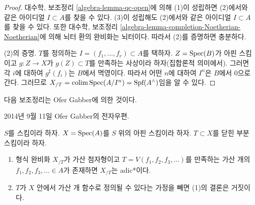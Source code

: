 \begin{proof}
대수학, 보조정리 \ref{algebra-lemma-qc-open}에 의해 (1)이
성립하면 (2)에서와 같은 아이디얼 $I \subset A$를 찾을 수 있다.
(3)이 성립해도 (2)에서와 같은 아이디얼 $I \subset A$를 찾을 수
있다. 또한 대수학, 보조정리
\ref{algebra-lemma-completion-Noetherian-Noetherian}에 의해
뇌터 환의 완비화는 뇌터이다. 따라서 (2)를 증명하면 충분하다.

\medskip\noindent
(2)의 증명.
$T$를 정의하는 $I = (f_1, \ldots, f_r) \subset A$를 택하자.
$Z = \mathop{\mathrm{Spec}}(B)$가 아핀 스킴이고 $g : Z \to X$가
$g(Z) \subset T$를 만족하는 사상이라 하자(집합론적 의미에서).
그러면 각 $i$에 대하여 $g^\sharp(f_i)$는 $B$에서 멱영이다.
따라서 어떤 $n$에 대하여 $I^n$은 $B$에서 0으로 간다. 그러므로
$X_{/T} = \mathop{\mathrm{colim}}\nolimits \mathop{\mathrm{Spec}}(A/I^n) = \text{Spf}(A^\wedge)$임을 알 수 있다.
\end{proof}

\noindent
다음 보조정리는 Ofer Gabber에 의한 것이다.

\begin{lemma}
\label{lemma-completion-countably-indexed}
\begin{reference}
2014년 9월 11일 Ofer Gabber의 전자우편.
\end{reference}
$S$를 스킴이라 하자. $X = \mathop{\mathrm{Spec}}(A)$를 $S$ 위의 아핀 스킴이라 하자.
$T \subset X$를 닫힌 부분스킴이라 하자.
\begin{enumerate}
\item 형식 완비화 $X_{/T}$가 가산 첨자형이고
$T = V(f_1, f_2, f_3, \ldots)$를 만족하는 가산 개의
$f_1, f_2, f_3, \ldots \in A$가 존재하면 $X_{/T}$는 adic*이다.
\item $T$가 $X$ 안에서 가산 개 함수로 정의될 수 있다는 가정을
빼면 (1)의 결론은 거짓이다.
\end{enumerate}
\end{lemma}


